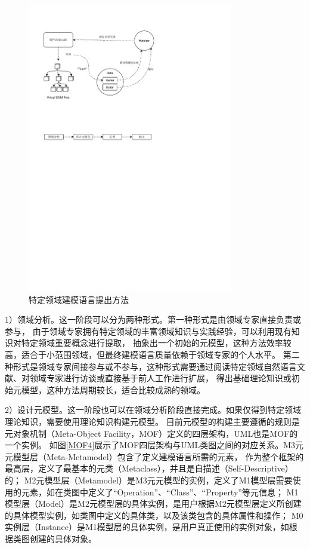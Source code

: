 \begin{figure}[h] %
    \centering %
    \includegraphics[width=0.8\textwidth]{FIGs/chapter3/DSMLmethod.pdf} %
    \caption{特定领域建模语言提出方法} %
    \label{DSMLmethod} %
\end{figure}%

1）领域分析。这一阶段可以分为两种形式。第一种形式是由领域专家直接负责或参与，
由于领域专家拥有特定领域的丰富领域知识与实践经验，可以利用现有知识对特定领域重要概念进行提取，
抽象出一个初始的元模型，这种方法效率较高，适合于小范围领域，但最终建模语言质量依赖于领域专家的个人水平。
第二种形式是领域专家间接参与或不参与，这种形式需要通过阅读特定领域自然语言文献、对领域专家进行访谈或直接基于前人工作进行扩展，
得出基础理论知识或初始元模型，这种方法周期较长，适合比较成熟的领域。

2）设计元模型。这一阶段也可以在领域分析阶段直接完成。如果仅得到特定领域理论知识，需要使用理论知识构建元模型。
目前元模型的构建主要遵循的规则是元对象机制（Meta-Object Facility，MOF）定义的四层架构，UML也是MOF的一个实例\cite{bezivin2004search}。
如图\ref{MOF4}展示了MOF四层架构与UML类图之间的对应关系。M3元元模型层（Meta-Metamodel）包含了定义建模语言所需的元素，
作为整个框架的最高层，定义了最基本的元类（Metaclass），并且是自描述（Self-Descriptive）的；
M2元模型层（Metamodel）是M3元元模型的实例，定义了M1模型层需要使用的元素，如在类图中定义了“Operation”、“Class”、“Property”等元信息；
M1模型层（Model）是M2元模型层的具体实例，是用户根据M2元模型层定义所创建的具体模型实例，如类图中定义的具体类，以及该类包含的具体属性和操作；
M0实例层（Instance）是M1模型层的具体实例，是用户真正使用的实例对象，如根据类图创建的具体对象。

